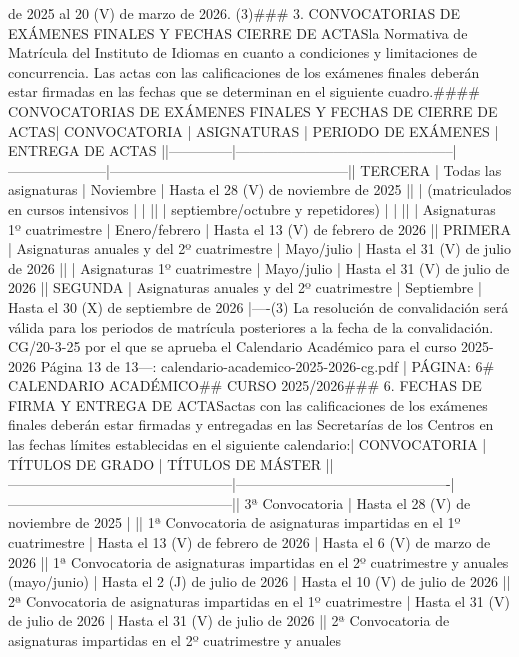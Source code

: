 \documentclass{article}
\begin{document}
\begin{itemize}
{de 2025 al 20 (V) de marzo de 2026. (3)\n\n### 3. CONVOCATORIAS DE EXÁMENES FINALES Y FECHAS CIERRE DE ACTAS\n{} la Normativa de Matrícula del Instituto de Idiomas en cuanto a condiciones y limitaciones de concurrencia. Las actas con las calificaciones de los exámenes finales deberán estar firmadas en las fechas que se determinan en el siguiente cuadro.\n\n#### CONVOCATORIAS DE EXÁMENES FINALES Y FECHAS DE CIERRE DE ACTAS\n\n| CONVOCATORIA | ASIGNATURAS                                   | PERIODO DE EXÁMENES | ENTREGA DE ACTAS                                   |\n|--------------|-----------------------------------------------|---------------------|---------------------------------------------------|\n| TERCERA      | Todas las asignaturas                         | Noviembre           | Hasta el 28 (V) de noviembre de 2025              |\n|              | (matriculados en cursos intensivos            |                     |                                                   |\n|              | septiembre/octubre y repetidores)            |                     |                                                   |\n|              | Asignaturas 1º cuatrimestre                  | Enero/febrero       | Hasta el 13 (V) de febrero de 2026                |\n| PRIMERA      | Asignaturas anuales y del 2º cuatrimestre    | Mayo/julio          | Hasta el 31 (V) de julio de 2026                  |\n|              | Asignaturas 1º cuatrimestre                  | Mayo/julio          | Hasta el 31 (V) de julio de 2026                  |\n| SEGUNDA      | Asignaturas anuales y del 2º cuatrimestre    | Septiembre          | Hasta el 30 (X) de septiembre de 2026             |\n\n----\n(3) La resolución de convalidación será válida para los periodos de matrícula posteriores a la fecha de la convalidación.\n{} CG/20-3-25 por el que se aprueba el Calendario Académico para el curso 2025-2026      Página 13 de 13\n\n---\n\nFUENTE: calendario-academico-2025-2026-cg.pdf | PÁGINA: 6\n# CALENDARIO ACADÉMICO\n## CURSO 2025/2026\n\n### 6. FECHAS DE FIRMA Y ENTREGA DE ACTAS\n\nLas actas con las calificaciones de los exámenes finales deberán estar firmadas y entregadas en las Secretarías de los Centros en las fechas límites establecidas en el siguiente calendario:\n\n| CONVOCATORIA                                   | TÍTULOS DE GRADO                             | TÍTULOS DE MÁSTER                             |\n|------------------------------------------------|----------------------------------------------|------------------------------------------------|\n| 3ª Convocatoria                                | Hasta el 28 (V) de noviembre de 2025       |                                                |\n| 1ª Convocatoria de asignaturas impartidas en el 1º cuatrimestre | Hasta el 13 (V) de febrero de 2026          | Hasta el 6 (V) de marzo de 2026               |\n| 1ª Convocatoria de asignaturas impartidas en el 2º cuatrimestre y anuales (mayo/junio) | Hasta el 2 (J) de julio de 2026             | Hasta el 10 (V) de julio de 2026              |\n| 2ª Convocatoria de asignaturas impartidas en el 1º cuatrimestre | Hasta el 31 (V) de julio de 2026            | Hasta el 31 (V) de julio de 2026              |\n| 2ª Convocatoria de asignaturas impartidas en el 2º cuatrimestre y anuales }
\end{itemize}
\end{document}
